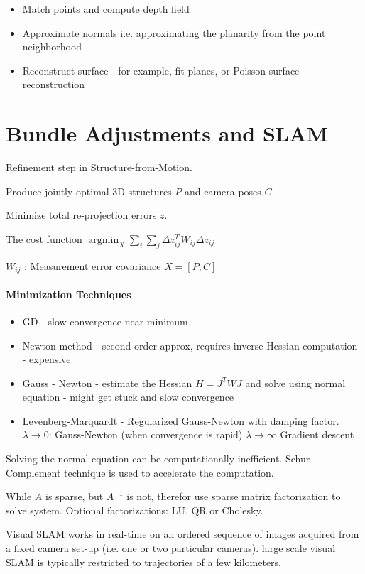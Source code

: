\begin{itemize}
\item Match points and compute depth field
\item Approximate normals i.e. approximating the planarity from the point neighborhood
\item  Reconstruct surface - for example, fit planes, or Poisson surface reconstruction
\end{itemize}

\section{Bundle Adjustments and SLAM}

Refinement step in Structure-from-Motion.

Produce jointly optimal 3D structures $P$ and camera poses $C$.

Minimize total re-projection errors $z$.

The cost function $\operatorname{argmin}_X \sum_i \sum_j \Delta z_{ij}^T W_{ij} \Delta z_{ij} $

$W_{ij}$ : Measurement error covariance
$X = [P,C]$


\paragraph{Minimization Techniques}

\begin{itemize}
\item GD - slow convergence near minimum
\item Newton method - second order approx, requires inverse Hessian computation - expensive
\item Gauss - Newton - estimate the Hessian $H = J^TWJ$ and solve using normal equation - might get stuck and slow convergence 
\item Levenberg-Marquardt - Regularized Gauss-Newton with damping factor. 
$\lambda \rightarrow 0$: Gauss-Newton (when convergence is rapid)
$\lambda \rightarrow \infty$ Gradient descent
\end{itemize}

Solving the normal equation can be computationally inefficient. Schur-Complement technique is used to accelerate the computation. 

While $A$ is sparse, but $A^{-1}$ is not, therefor use sparse matrix factorization to solve system. 
Optional factorizations: LU, QR or Cholesky.

Visual SLAM works in real-time on an ordered sequence of images acquired from a fixed camera set-up (i.e. one or two particular cameras). 
large scale visual SLAM is typically restricted to trajectories of a few kilometers.

